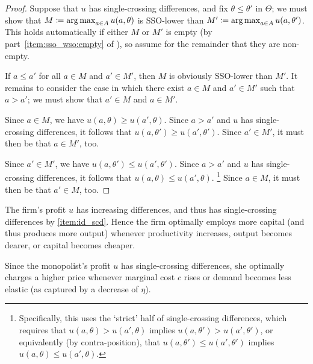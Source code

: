 \begin{proof}
	Suppose that $u$ has single-crossing differences, and fix $\theta \leq \theta'$ in $\Theta$; we must show that $M \coloneqq \operatorname*{arg\,max}_{a \in A} u(a,\theta)$ is SSO-lower than $M' \coloneqq \operatorname*{arg\,max}_{a \in A} u(a,\theta')$. This holds automatically if either $M$ or $M'$ is empty (by part~\ref{item:sso_wso:empty} of ), so assume for the remainder that they are non-empty.

	If $a \leq a'$ for all $a \in M$ and $a' \in M'$, then $M$ is obviously SSO-lower than $M'$. It remains to consider the case in which there exist $a \in M$ and $a' \in M'$ such that $a > a'$; we must show that $a' \in M$ and $a \in M'$.

	Since $a \in M$, we have $u(a,\theta) \geq u(a',\theta)$. Since $a > a'$ and $u$ has single-crossing differences, it follows that $u(a,\theta') \geq u(a',\theta')$. Since $a' \in M'$, it must then be that $a \in M'$, too.

	Since $a' \in M'$, we have $u(a,\theta') \leq u(a',\theta')$. Since $a > a'$ and $u$ has single-crossing differences, it follows that $u(a,\theta) \leq u(a',\theta)$.%
		\footnote{Specifically, this uses the `strict' half of single-crossing differences, which requires that $u(a,\theta) > u(a',\theta)$ implies $u(a,\theta') > u(a',\theta')$, or equivalently (by contra-position), that $u(a,\theta') \leq u(a',\theta')$ implies $u(a,\theta) \leq u(a',\theta)$.}
	Since $a \in M$, it must then be that $a' \in M$, too.
\end{proof}

\begin{namedthm}[\Cref*{example:prod} {\normalfont (continued)}.]
	\label{example:prod_mcs}
	The firm's profit $u$ has increasing differences, and thus has single-crossing differences by \ref{item:id_scd}. Hence the firm optimally employs more capital (and thus produces more output) whenever productivity increases, output becomes dearer, or capital becomes cheaper.
\end{namedthm}

\begin{namedthm}
	\label{example:monopoly_mcs}
	Since the monopolist's profit $u$ has single-crossing differences, she optimally charges a higher price whenever marginal cost $c$ rises or demand becomes less elastic (as captured by a decrease of $\eta$).
\end{namedthm}

